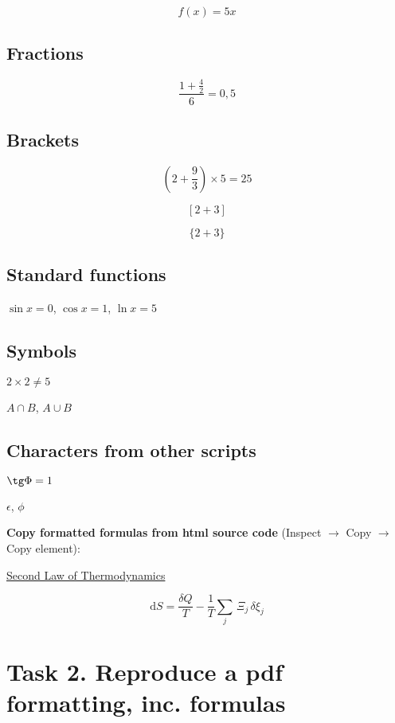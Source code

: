 \documentclass[a4paper,11pt]{article}
\begin{document}
\begin{equation}\label{eq:same}
f(x)=5x
\end{equation}

\subsection{Fractions}

\[\frac{1+\frac{4}{2}}{6} = 0,5\]

\subsection{Brackets}

\[ \left(2+\frac{9}{3}\right) \times 5 = 25 \]

\[  [2+3]  \]

\[ \{2+3\}  \]

\subsection{Standard functions}

$\sin x = 0$, $\cos x = 1$, $\ln x = 5$

\subsection{Symbols}

$2\times 2 \ne 5$

$A \cap B$, $A \cup B$

\subsection{Characters from other scripts}

$\tg \Phi = 1$

$\epsilon$, $\phi$

\bigskip


\textbf{{\color{red}Copy formatted formulas from html source code}} (Inspect $\rightarrow$ Copy $\rightarrow$ Copy element):

 \href{https://en.wikipedia.org/wiki/Second_law_of_thermodynamics}{Second Law of Thermodynamics}
 
\[\mathrm {d} S={\frac {\delta Q}{T}}-{\frac {1}{T}}\sum _{j}\,\Xi _{j}\,\delta \xi _{j}\]


\section*{Task 2. Reproduce a pdf formatting, inc. formulas}
\label{task}
\end{document}
